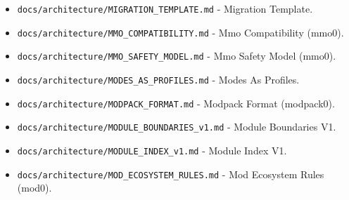 \documentclass[9pt,a4paper,openany]{book}
\begin{document}
\begin{itemize}
\item \texttt{docs/\allowbreak{}architecture/\allowbreak{}MIGRATION\_\allowbreak{}TEMPLATE.\allowbreak{}md} -\allowbreak{} Migration Template.\allowbreak{}
\end{itemize}

\begin{itemize}
\item \texttt{docs/\allowbreak{}architecture/\allowbreak{}MMO\_\allowbreak{}COMPATIBILITY.\allowbreak{}md} -\allowbreak{} Mmo Compatibility (mmo0).\allowbreak{}
\end{itemize}

\begin{itemize}
\item \texttt{docs/\allowbreak{}architecture/\allowbreak{}MMO\_\allowbreak{}SAFETY\_\allowbreak{}MODEL.\allowbreak{}md} -\allowbreak{} Mmo Safety Model (mmo0).\allowbreak{}
\end{itemize}

\begin{itemize}
\item \texttt{docs/\allowbreak{}architecture/\allowbreak{}MODES\_\allowbreak{}AS\_\allowbreak{}PROFILES.\allowbreak{}md} -\allowbreak{} Modes As Profiles.\allowbreak{}
\end{itemize}

\begin{itemize}
\item \texttt{docs/\allowbreak{}architecture/\allowbreak{}MODPACK\_\allowbreak{}FORMAT.\allowbreak{}md} -\allowbreak{} Modpack Format (modpack0).\allowbreak{}
\end{itemize}

\begin{itemize}
\item \texttt{docs/\allowbreak{}architecture/\allowbreak{}MODULE\_\allowbreak{}BOUNDARIES\_\allowbreak{}v1.\allowbreak{}md} -\allowbreak{} Module Boundaries V1.\allowbreak{}
\end{itemize}

\begin{itemize}
\item \texttt{docs/\allowbreak{}architecture/\allowbreak{}MODULE\_\allowbreak{}INDEX\_\allowbreak{}v1.\allowbreak{}md} -\allowbreak{} Module Index V1.\allowbreak{}
\end{itemize}

\begin{itemize}
\item \texttt{docs/\allowbreak{}architecture/\allowbreak{}MOD\_\allowbreak{}ECOSYSTEM\_\allowbreak{}RULES.\allowbreak{}md} -\allowbreak{} Mod Ecosystem Rules (mod0).\allowbreak{}
\end{itemize}
\end{document}
